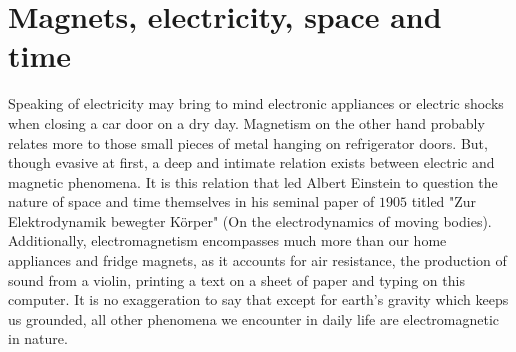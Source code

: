 \section{Magnets, electricity, space and time}
\label{ElectromagneticSection}

\noindent Speaking of electricity may bring to mind electronic appliances or electric shocks when closing a car door on a dry day. Magnetism on the other hand probably relates more to those small pieces of metal hanging on refrigerator doors. But, though evasive at first, a deep and intimate relation exists between electric and magnetic phenomena. It is this relation that led Albert Einstein to question the nature of space and time themselves in his seminal paper of $1905$ titled "Zur Elektrodynamik bewegter K\"orper" (On the electrodynamics of moving bodies). Additionally, electromagnetism encompasses much more than our home appliances and fridge magnets, as it accounts for air resistance, the production of sound from a violin, printing a text on a sheet of paper and typing on this computer. It is no exaggeration to say that except for earth's gravity which keeps us grounded, all other phenomena we encounter in daily life are electromagnetic in nature. 

